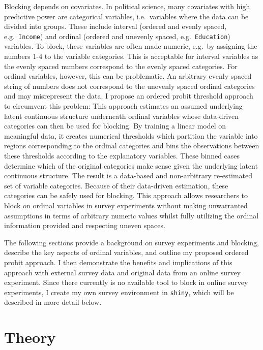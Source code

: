 \documentclass[12pt,econ]{sources/authesis}
\begin{document}
Blocking depends on covariates. In political science, many covariates with high predictive power are categorical variables, i.e.~variables where the data can be divided into groups. These include interval (ordered and evenly spaced, e.g.~\texttt{Income}) and ordinal (ordered and unevenly spaced, e.g.~\texttt{Education}) variables. To block, these variables are often made numeric, e.g.~by assigning the numbers 1-4 to the variable categories. This is acceptable for interval variables as the evenly spaced numbers correspond to the evenly spaced categories. For ordinal variables, however, this can be problematic. An arbitrary evenly spaced string of numbers does not correspond to the unevenly spaced ordinal categories and may misrepresent the data. I propose an ordered probit threshold approach to circumvent this problem: This approach estimates an assumed underlying latent continuous structure underneath ordinal variables whose data-driven categories can then be used for blocking. By training a linear model on meaningful data, it creates numerical thresholds which partition the variable into regions corresponding to the ordinal categories and bins the observations between these thresholds according to the explanatory variables. These binned cases determine which of the original categories make sense given the underlying latent continuous structure. The result is a data-based and non-arbitrary re-estimated set of variable categories. Because of their data-driven estimation, these categories can be safely used for blocking. This approach allows researchers to block on ordinal variables in survey experiments without making unwarranted assumptions in terms of arbitrary numeric values whilst fully utilizing the ordinal information provided and respecting uneven spaces.

The following sections provide a background on survey experiments and blocking, describe the key aspects of ordinal variables, and outline my proposed ordered probit approach. I then demonstrate the benefits and implications of this approach with external survey data and original data from an online survey experiment. Since there currently is no available tool to block in online survey experiments, I create my own survey environment in \texttt{shiny}, which will be described in more detail below.

\hypertarget{ordblock-theory}{%
\section{Theory}\label{ordblock-theory}}
\end{document}

